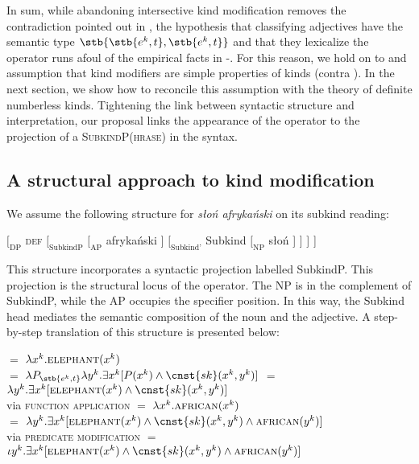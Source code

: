 \documentclass[output=paper,
colorlinks,
citecolor=brown,
newtxmath
]{langscibook}
\begin{document}
In sum, while abandoning intersective kind modification removes the contradiction pointed out in , the hypothesis that classifying adjectives have the semantic type $\stb{\stb{e^k,t},\stb{e^k,t}}$ and that they lexicalize the  operator runs afoul of the empirical facts in -. For this reason, we hold on to  and  assumption that kind modifiers are simple properties of kinds (contra \citealt{Borik.Espinal2018}). In the next section, we show how to reconcile this assumption with the theory of definite numberless kinds. Tightening the link between syntactic structure and interpretation, our proposal links the appearance of the  operator to the projection of a \textsc{SubkindP(hrase)} in the syntax.

\subsection{A structural approach to kind modification}
\label{sec:structural-approach}

We assume the following structure for \textit{słoń afrykański} on its subkind reading:

\ea $[_\text{DP}$ \textsc{def} $[_\text{SubkindP}$ $[_\text{AP}$ afrykański $]$ $[_\text{Subkind'}$  Subkind $[_\text{NP}$ słoń ] ] ] ]
\label{ex:structure_1}
\z

\noindent
This structure incorporates a syntactic projection labelled SubkindP. This projection is the structural locus of the  operator. The NP is in the complement of SubkindP, while the AP occupies the specifier position. In this way, the Subkind head mediates the semantic composition of the noun and the adjective. A step-by-step translation of this structure is presented below:

\ea
\ea {} $=$ $\lambda x^k.\textsc{elephant}(x^k)$\\
\ex {} $=$ $\lambda P_{\stb{e^k, t}}\lambda y^k.\exists x^k [P(x^k) \wedge \cnst{sk}(x^k, y^k)]$
\ex {} $=$ $\lambda y^k.\exists x^k [\textsc{elephant}(x^k) \wedge \cnst{sk}(x^k, y^k)]$\\
    \hfill via \textsc{function application}
\ex {} $=$ $\lambda x^k.\textsc{african}(x^k)$\\
\ex {} $=$ $\lambda y^k.\exists x^k [\textsc{elephant}(x^k) \wedge \cnst{sk}(x^k, y^k) \wedge \textsc{african}(y^k)]$\\
    \hfill via \textsc{predicate modification}
\ex {} $=$ $\iota y^k.\exists x^k [\textsc{elephant}(x^k) \wedge \cnst{sk}(x^k, y^k) \wedge \textsc{african}(y^k)]$\\
\z \z
\end{document}
